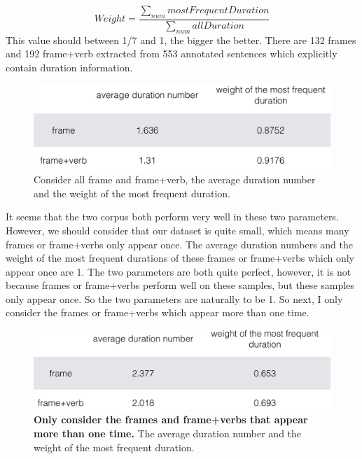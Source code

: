 \documentclass[11pt,a4paper]{article}
\begin{document}
\[Weight =  \frac{\sum_{num} mostFrequentDuration}{\sum_{num} allDuration}\]
This value should between 1/7 and 1, the bigger the better.
There are 132 frames and 192 frame+verb extracted from 553 annotated sentences which explicitly contain duration information.

\begin{figure}[H] 
\begin{center} 
\centerline{\includegraphics[width=\columnwidth]{figs/fig5.png}}
\caption{Consider all frame and frame+verb, the average duration number and the weight of the most frequent duration.}
\label{fifth_fig}
\end{center}
\vskip -0.3in
\end{figure}

It seems that the two corpus both perform very well in these two parameters. However, we should consider that our dataset is quite small, which means many frames or frame+verbs only appear once. The average duration numbers and the weight of the most frequent durations of these frames or frame+verbs which only appear once are 1. The two parameters are both quite perfect, however, it is not because frames or frame+verbs perform well on these samples, but these samples only appear once. So the two parameters are naturally to be 1. 
So next, I only consider the frames or frame+verbs which appear more than one time.

\begin{figure}[H] 
\begin{center} 
\centerline{\includegraphics[width=\columnwidth]{figs/fig6.png}}
\caption{\textbf{Only consider the frames and frame+verbs that appear more than one time.} The average duration number and the weight of the most frequent duration.}
\label{sixth_fig}
\end{center}
\vskip -0.3in
\end{figure}
\end{document}
